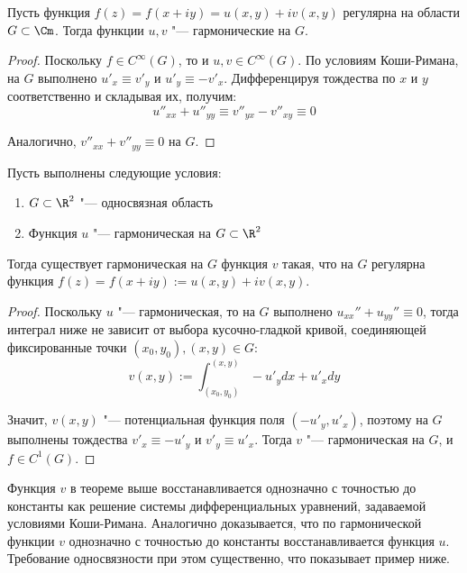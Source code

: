 \begin{proposition}
	Пусть функция $f(z) = f(x + iy) = u(x, y) + iv(x, y)$ регулярна на области $G \subset \Cm$. Тогда функции $u, v$ "--- гармонические на $G$.
\end{proposition}

\begin{proof}
	Поскольку $f \in C^\infty(G)$, то и $u, v \in C^\infty(G)$. По условиям Коши-Римана, на $G$ выполнено $u'_x \equiv v'_y$ и $u'_y \equiv -v'_x$. Дифференцируя тождества по $x$ и $y$ соответственно и складывая их, получим:
	\[u''_{xx} + u''_{yy} \equiv v''_{yx} - v''_{xy} \equiv 0\]
	
	Аналогично, $v''_{xx} + v''_{yy} \equiv 0$ на $G$.
\end{proof}

\begin{proposition}
	Пусть выполнены следующие условия:
	\begin{enumerate}
		\item $G \subset \R^2$ "--- односвязная область
		\item Функция $u$ "--- гармоническая на $G \subset \R^2$
	\end{enumerate}
	
	Тогда существует гармоническая на $G$ функция $v$ такая, что на $G$ регулярна функция $f(z) = f(x + iy) := u(x, y) + iv(x, y)$.
\end{proposition}

\begin{proof}
	Поскольку $u$ "--- гармоническая, то на $G$ выполнено $u_{xx}'' + u_{yy}'' \equiv 0$, тогда интеграл ниже не зависит от выбора кусочно-гладкой кривой, соединяющей фиксированные точки $(x_0, y_0), (x, y) \in G$:
	\[v(x, y) := \int_{(x_0, y_0)}^{(x, y)}-u'_ydx + u'_xdy\]
	
	Значит, $v(x, y)$ "--- потенциальная функция поля $(-u'_y, u'_x)$, поэтому на $G$ выполнены тождества $v'_x \equiv -u'_y$ и $v'_y \equiv u'_x$. Тогда $v$ "--- гармоническая на $G$, и $f \in C^1(G)$.
\end{proof}

\begin{note}
	Функция $v$ в теореме выше восстанавливается однозначно с точностью до константы как решение системы дифференциальных уравнений, задаваемой условиями Коши-Римана. Аналогично доказывается, что по гармонической функции $v$ однозначно с точностью до константы восстанавливается функция $u$. Требование односвязности при этом существенно, что показывает пример ниже.
\end{note}

